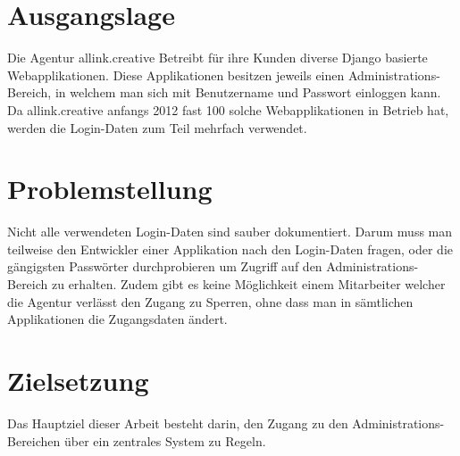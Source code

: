 \section{Ausgangslage}
\label{sec:Ausgangslage}
Die Agentur allink.creative Betreibt für ihre Kunden diverse Django basierte 
Webapplikationen. Diese Applikationen besitzen jeweils einen 
Administrations-Bereich, in welchem man sich mit Benutzername und Passwort 
einloggen kann. Da allink.creative anfangs 2012 fast 100 solche 
Webapplikationen in Betrieb hat, werden die Login-Daten zum Teil mehrfach 
verwendet.

\section{Problemstellung}
\label{sec:Problemstellung}
Nicht alle verwendeten Login-Daten sind sauber dokumentiert. Darum muss man 
teilweise den Entwickler einer Applikation nach den Login-Daten fragen, oder 
die gängigsten Passwörter durchprobieren um Zugriff auf den 
Administrations-Bereich zu erhalten. Zudem gibt es keine Möglichkeit einem 
Mitarbeiter welcher die Agentur verlässt den Zugang zu Sperren, ohne dass man 
in sämtlichen Applikationen die Zugangsdaten ändert.

\section{Zielsetzung}
\label{sec:Zielsetzung}
Das Hauptziel dieser Arbeit besteht darin, den Zugang zu den Administrations-Bereichen über ein zentrales System zu Regeln.

